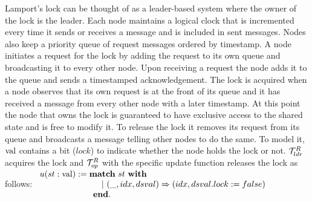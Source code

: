 Lamport's lock can be thought of as a leader-based system where the owner of
the lock is the leader.
Each node maintains a logical clock that is incremented every time it sends or
receives a message and is included in sent messages.
Nodes also keep a priority queue of request messages ordered by timestamp.
A node initiates a request for the lock by adding the request to its own queue
and broadcasting it to every other node.
Upon receiving a request the node adds it to the queue and sends a timestamped
acknowledgement.
The lock is acquired when a node observes that its own request is at the front
of its queue and it has received a message from every other node with a later
timestamp.
At this point the node that owns the lock is guaranteed to have exclusive
access to the shared state and is free to modify it.
To release the lock it removes its request from its queue and broadcasts a
message telling other nodes to do the same.
To model it, $\mathrm{val}$ contains a bit ($lock$) to indicate whether the node holds the lock or not.
$\mathcal{T}^{R}_{ldr}$ acquires the lock and $\mathcal{T}^{R}_{op}$ with the specific update function 
releases the lock as follows:
$
\begin{array}{l}
u (st : \mathrm{val}) := \mbox{\textbf{match}} \ st \ \mbox{\textbf{with}}\\
 \ \ \ \ \ \ \ \ \ \ \ \ \ \ \ \ \ \ \ \ \ \ \vert~(\_, idx, dsval) \Rightarrow (idx, dsval.lock := false)\\
 \ \ \ \ \ \ \ \ \ \ \ \ \ \ \ \ \ \ \ \mbox{\textbf{end}}.\\
\end{array}
$


